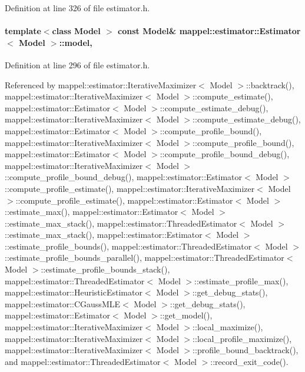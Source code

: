 Definition at line 326 of file estimator.\+h.

\paragraph[{\texorpdfstring{model}{model}}]{\setlength{\rightskip}{0pt plus 5cm}template$<$class Model $>$ const Model\& {\bf mappel\+::estimator\+::\+Estimator}$<$ Model $>$\+::model\hspace{0.3cm}{\ttfamily [protected]}, {\ttfamily [inherited]}}\hypertarget{classmappel_1_1estimator_1_1Estimator_a2f157410771fb79a20d4d54e505750d0}{}\label{classmappel_1_1estimator_1_1Estimator_a2f157410771fb79a20d4d54e505750d0}


Definition at line 296 of file estimator.\+h.



Referenced by mappel\+::estimator\+::\+Iterative\+Maximizer$<$ Model $>$\+::backtrack(), mappel\+::estimator\+::\+Iterative\+Maximizer$<$ Model $>$\+::compute\+\_\+estimate(), mappel\+::estimator\+::\+Estimator$<$ Model $>$\+::compute\+\_\+estimate\+\_\+debug(), mappel\+::estimator\+::\+Iterative\+Maximizer$<$ Model $>$\+::compute\+\_\+estimate\+\_\+debug(), mappel\+::estimator\+::\+Estimator$<$ Model $>$\+::compute\+\_\+profile\+\_\+bound(), mappel\+::estimator\+::\+Iterative\+Maximizer$<$ Model $>$\+::compute\+\_\+profile\+\_\+bound(), mappel\+::estimator\+::\+Estimator$<$ Model $>$\+::compute\+\_\+profile\+\_\+bound\+\_\+debug(), mappel\+::estimator\+::\+Iterative\+Maximizer$<$ Model $>$\+::compute\+\_\+profile\+\_\+bound\+\_\+debug(), mappel\+::estimator\+::\+Estimator$<$ Model $>$\+::compute\+\_\+profile\+\_\+estimate(), mappel\+::estimator\+::\+Iterative\+Maximizer$<$ Model $>$\+::compute\+\_\+profile\+\_\+estimate(), mappel\+::estimator\+::\+Estimator$<$ Model $>$\+::estimate\+\_\+max(), mappel\+::estimator\+::\+Estimator$<$ Model $>$\+::estimate\+\_\+max\+\_\+stack(), mappel\+::estimator\+::\+Threaded\+Estimator$<$ Model $>$\+::estimate\+\_\+max\+\_\+stack(), mappel\+::estimator\+::\+Estimator$<$ Model $>$\+::estimate\+\_\+profile\+\_\+bounds(), mappel\+::estimator\+::\+Threaded\+Estimator$<$ Model $>$\+::estimate\+\_\+profile\+\_\+bounds\+\_\+parallel(), mappel\+::estimator\+::\+Threaded\+Estimator$<$ Model $>$\+::estimate\+\_\+profile\+\_\+bounds\+\_\+stack(), mappel\+::estimator\+::\+Threaded\+Estimator$<$ Model $>$\+::estimate\+\_\+profile\+\_\+max(), mappel\+::estimator\+::\+Heuristic\+Estimator$<$ Model $>$\+::get\+\_\+debug\+\_\+stats(), mappel\+::estimator\+::\+C\+Gauss\+M\+L\+E$<$ Model $>$\+::get\+\_\+debug\+\_\+stats(), mappel\+::estimator\+::\+Estimator$<$ Model $>$\+::get\+\_\+model(), mappel\+::estimator\+::\+Iterative\+Maximizer$<$ Model $>$\+::local\+\_\+maximize(), mappel\+::estimator\+::\+Iterative\+Maximizer$<$ Model $>$\+::local\+\_\+profile\+\_\+maximize(), mappel\+::estimator\+::\+Iterative\+Maximizer$<$ Model $>$\+::profile\+\_\+bound\+\_\+backtrack(), and mappel\+::estimator\+::\+Threaded\+Estimator$<$ Model $>$\+::record\+\_\+exit\+\_\+code().

